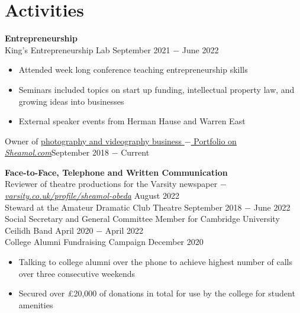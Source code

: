 \documentclass{article}
\begin{document}
\vspace{-.5\baselineskip}
\hrulefill
\vspace{-.5\baselineskip}

\clearpage
\section*{Activities}

\textbf{Entrepreneurship}\\
King's Entrepreneurship Lab \hfill September 2021 $-$ June 2022
\begin{itemize}
    \item Attended week long conference teaching entrepreneurship skills
    \item Seminars included topics on start up funding, intellectual property law, and growing ideas into businesses
    \item External speaker events from Herman Hause and Warren East 
\end{itemize}
Owner of \href{www.sheamol.com}{photography and videography business $-$ Portfolio on \underline{\textit{Sheamol.com}}}\hfill September 2018 $-$ Current \medskip

\textbf{Face-to-Face, Telephone and Written Communication}\\
Reviewer of theatre productions for the Varsity newspaper $-$ \href{https://www.varsity.co.uk/profile/sheamol-obeda}{\underline{\textit{varsity.co.uk/profile/sheamol-obeda}}} \hfill August 2022 \\
Steward at the Amateur Dramatic Club Theatre \hfill September 2018 $-$ June 2022 \\
Social Secretary and General Committee Member for Cambridge University Ceilidh Band \hfill April 2020 $-$ April 2022\\
College Alumni Fundraising Campaign \hfill December 2020
\begin{itemize}
    \item Talking to college alumni over the phone to achieve highest number of calls over three consecutive weekends
    \item Secured over £20,000 of donations in total for use by the college for student amenities
\end{itemize} \medskip
\end{document}
